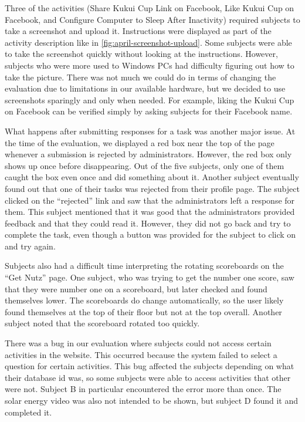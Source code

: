 Three of the activities (Share Kukui Cup Link on Facebook, Like Kukui Cup on Facebook, and Configure Computer to Sleep After Inactivity) required subjects to take a screenshot and upload it. Instructions were displayed as part of the activity description like in \autoref{fig:april-screenshot-upload}. Some subjects were able to take the screenshot quickly without looking at the instructions. However, subjects who were more used to Windows PCs had difficulty figuring out how to take the picture. There was not much we could do in terms of changing the evaluation due to limitations in our available hardware, but we decided to use screenshots sparingly and only when needed. For example, liking the Kukui Cup on Facebook can be verified simply by asking subjects for their Facebook name.

What happens after submitting responses for a task was another major issue. At the time of the evaluation, we displayed a red box near the top of the page whenever a submission is rejected by administrators. However, the red box only shows up once before disappearing. Out of the five subjects, only one of them caught the box even once and did something about it. Another subject eventually found out that one of their tasks was rejected from their profile page. The subject clicked on the ``rejected'' link and saw that the administrators left a response for them. This subject mentioned that it was good that the administrators provided feedback and that they could read it. However, they did not go back and try to complete the task, even though a button was provided for the subject to click on and try again.

Subjects also had a difficult time interpreting the rotating scoreboards on the ``Get Nutz'' page. One subject, who was trying to get the number one score, saw that they were number one on a scoreboard, but later checked and found themselves lower. The scoreboards do change automatically, so the user likely found themselves at the top of their floor but not at the top overall. Another subject noted that the scoreboard rotated too quickly.

There was a bug in our evaluation where subjects could not access certain activities in the website. This occurred because the system failed to select a question for certain activities. This bug affected the subjects depending on what their database id was, so some subjects were able to access activities that other were not. Subject B in particular encountered the error more than once. The solar energy video was also not intended to be shown, but subject D found it and completed it.

